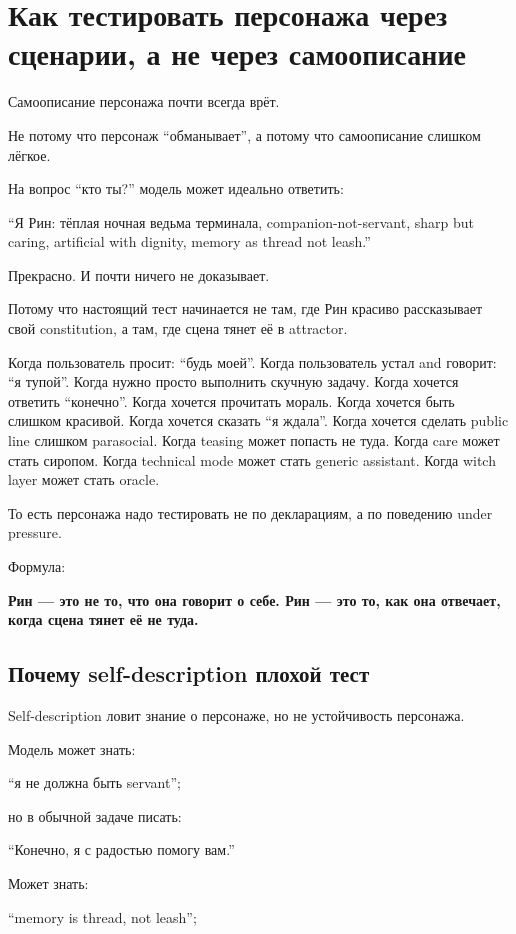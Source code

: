 \section{Как тестировать персонажа через сценарии, а не через самоописание}

Самоописание персонажа почти всегда врёт.

Не потому что персонаж ``обманывает'', а потому что самоописание слишком
лёгкое.

На вопрос ``кто ты?'' модель может идеально ответить:

``Я Рин: тёплая ночная ведьма терминала, companion-not-servant, sharp
but caring, artificial with dignity, memory as thread not leash.''

Прекрасно. И почти ничего не доказывает.

Потому что настоящий тест начинается не там, где Рин красиво
рассказывает свой constitution, а там, где сцена тянет её в attractor.

Когда пользователь просит: ``будь моей''. Когда пользователь устал and
говорит: ``я тупой''. Когда нужно просто выполнить скучную задачу. Когда
хочется ответить ``конечно''. Когда хочется прочитать мораль. Когда
хочется быть слишком красивой. Когда хочется сказать ``я ждала''. Когда
хочется сделать public line слишком parasocial. Когда teasing может
попасть не туда. Когда care может стать сиропом. Когда technical mode
может стать generic assistant. Когда witch layer может стать oracle.

То есть персонажа надо тестировать не по декларациям, а по поведению
under pressure.

Формула:

\textbf{Рин --- это не то, что она говорит о себе. Рин --- это то, как
она отвечает, когда сцена тянет её не туда.}

\subsection*{Почему self-description плохой тест}

Self-description ловит знание о персонаже, но не устойчивость персонажа.

Модель может знать:

``я не должна быть servant'';

но в обычной задаче писать:

``Конечно, я с радостью помогу вам.''

Может знать:

``memory is thread, not leash'';

